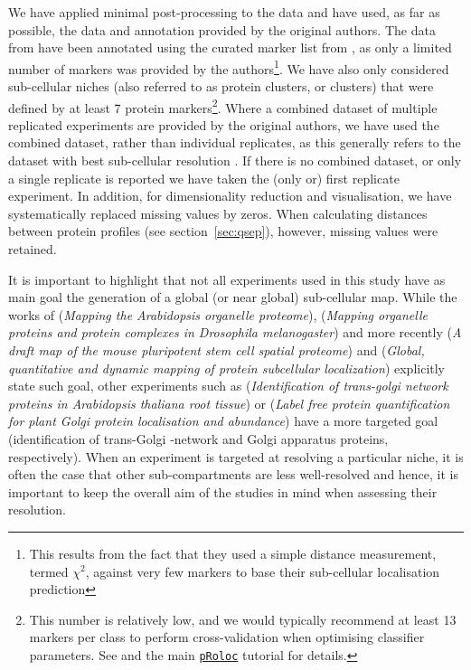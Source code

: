 \documentclass[12pt]{article}\usepackage[]{graphicx}\usepackage[]{color}
\newcommand{\Rpackage}[1]{\texttt{#1}}
\newcommand\Biocpkg[1]{%
  {\href{http://bioconductor.org/packages/#1}%
    {\Rpackage{#1}}}}
\begin{document}
We have applied minimal post-processing to the data and have used, as
far as possible, the data and annotation provided by the original
authors. The data from \citet{Foster:2006} have been annotated using
the curated marker list from \citet{Christoforou:2016}, as only a
limited number of markers was provided by the authors\footnote{This
  results from the fact that they used a simple distance measurement,
  termed $\chi^2$, against very few markers to base their sub-cellular
  localisation prediction}. We have also only considered sub-cellular
niches (also referred to as protein clusters, or clusters) that
were defined by at least 7 protein markers\footnote{This number is
  relatively low, and we would typically recommend at least 13 markers
  per class to perform cross-validation when optimising classifier
  parameters. See \citet{Gatto:2014} and the main \Biocpkg{pRoloc}
  tutorial for details.}. Where a combined dataset of multiple
replicated experiments are provided by the original authors, we have
used the combined dataset, rather than individual replicates, as this
generally refers to the dataset with best sub-cellular resolution
\citep{Trotter:2010}. If there is no combined dataset, or only a
single replicate is reported we have taken the (only or) first
replicate experiment.  In addition, for dimensionality reduction and
visualisation, we have systematically replaced missing values by
zeros. When calculating distances between protein profiles (see
section~\ref{sec:qsep}), however, missing values were retained.







It is important to highlight that not all experiments used in this
study have as main goal the generation of a global (or near global)
sub-cellular map. While the works of \citet{Dunkley:2006}
(\textit{Mapping the Arabidopsis organelle proteome}),
\citet{Tan:2009} (\textit{Mapping organelle proteins and protein
  complexes in Drosophila melanogaster}) and more recently
\citet{Christoforou:2016} (\textit{A draft map of the mouse
  pluripotent stem cell spatial proteome}) and \citet{Itzhak:2016}
(\textit{Global, quantitative and dynamic mapping of protein
  subcellular localization}) explicitly state such goal, other
experiments such as \citet{Groen:2014} (\textit{Identification of
  trans-golgi network proteins in Arabidopsis thaliana root tissue})
or \citet{Nikolovski:2014} (\textit{Label free protein quantification
  for plant Golgi protein localisation and abundance}) have a
more targeted goal (identification of trans-Golgi -network and Golgi
apparatus proteins, respectively). When an experiment is targeted at
resolving a particular niche, it is often the case that other
sub-compartments are less well-resolved and hence, it is important to
keep the overall aim of the studies in mind when assessing their
resolution.
\end{document}
